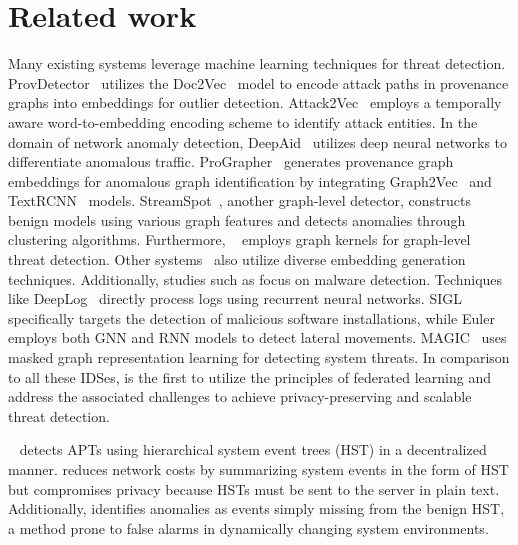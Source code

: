 \section{Related work}
\label{s:relwk}



 Many existing systems leverage machine learning techniques for threat detection. ProvDetector~\cite{provdetector2020} utilizes the Doc2Vec~\cite{le2014distributed} model to encode attack paths in provenance graphs into embeddings for outlier detection. Attack2Vec~\cite{shen2019attack2vec} employs a temporally aware word-to-embedding encoding scheme to identify attack entities. In the domain of network anomaly detection, DeepAid~\cite{deepaid} utilizes deep neural networks to differentiate anomalous traffic. ProGrapher~\cite{yangprographer} generates provenance graph embeddings for anomalous graph identification by integrating Graph2Vec~\cite{narayanan2017graph2vec} and TextRCNN~\cite{lai2015recurrent} models. StreamSpot~\cite{streamspot}, another graph-level detector, constructs benign models using various graph features and detects anomalies through clustering algorithms. Furthermore, \unicorn~\cite{han2020unicorn} employs graph kernels for graph-level threat detection. Other systems~\cite{aljawarneh2018anomaly, maseer2021benchmarking, gyanchandani2012taxonomy,atlas} also utilize diverse embedding generation techniques. Additionally, studies such as \cite{zolkipli2011approach, chakkaravarthy2019survey, isohara2011kernel} focus on malware detection. Techniques like DeepLog~\cite{deeplog2017} directly process logs using recurrent neural networks. SIGL~\cite{sigl} specifically targets the detection of malicious software installations, while Euler~\cite{king2022euler} employs both GNN and RNN models to detect lateral movements. MAGIC~\cite{jia2023magic} uses masked graph representation learning for detecting system threats. In comparison to all these IDSes, \Sys is the first to utilize the principles of federated learning and address the associated challenges to achieve privacy-preserving and scalable threat detection.

\disdet~\cite{dong2023distdet} detects APTs using hierarchical system event trees (HST) in a decentralized manner. \disdet reduces network costs by summarizing system events in the form of HST but compromises privacy because HSTs must be sent to the server in plain text. Additionally, \disdet identifies anomalies as events simply missing from the benign HST, a method prone to false alarms in dynamically changing system environments. 

